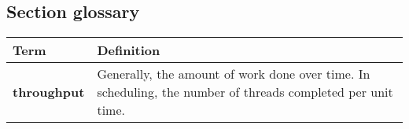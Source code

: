 \subsection*{Section glossary}
\centering
\begin{tabular}{>{\raggedright}p{} >{\raggedright\arraybackslash}p{}}
\toprule
\textbf{Term} & \textbf{Definition} \\
\midrule
\textbf{throughput} & Generally, the amount of work done over time. In scheduling, the number of threads completed per unit time. \\
\bottomrule
\end{tabular}
\vspace{\baselineskip}
